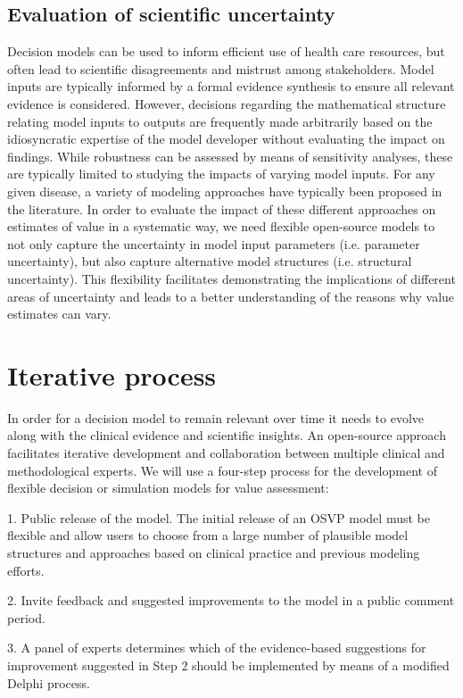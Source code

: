 \documentclass[11pt,final,fleqn]{article}\usepackage[]{graphicx}\usepackage[]{color}
\theoremstyle{plain}
\begin{document}
{\subsection{Evaluation of scientific uncertainty}
Decision models can be used to inform efficient use of health care resources, but often lead to scientific disagreements and mistrust among stakeholders. Model inputs are typically informed by a formal evidence synthesis to ensure all relevant evidence is considered. However, decisions regarding the mathematical structure relating model inputs to outputs are frequently made arbitrarily based on the idiosyncratic expertise of the model developer without evaluating the impact on findings. While robustness can be assessed by means of sensitivity analyses, these are typically limited to studying the impacts of varying model inputs. For any given disease, a variety of modeling approaches have typically been proposed in the literature. In order to evaluate the impact of these different approaches on estimates of value in a systematic way, we need flexible open-source models to not only capture the uncertainty in model input parameters (i.e. parameter uncertainty), but also capture alternative model structures (i.e. structural uncertainty). This flexibility facilitates demonstrating the implications of different areas of uncertainty and leads to a better understanding of the reasons why value estimates can vary.


\section{Iterative process}\label{sec:process}
In order for a decision model to remain relevant over time it needs to evolve along with the clinical evidence and scientific insights. An open-source approach facilitates iterative development and collaboration between multiple clinical and methodological experts. We will use a four-step process for the development of flexible decision or simulation models for value assessment:

1.	Public release of the model. The initial release of an OSVP model must be flexible and allow users to choose from a large number of plausible model structures and approaches based on clinical practice and previous modeling efforts.

2.	Invite feedback and suggested improvements to the model in a public comment period.

3.	A panel of experts determines which of the evidence-based suggestions for improvement suggested in Step 2 should be implemented by means of a modified Delphi process.

}
\end{document}
